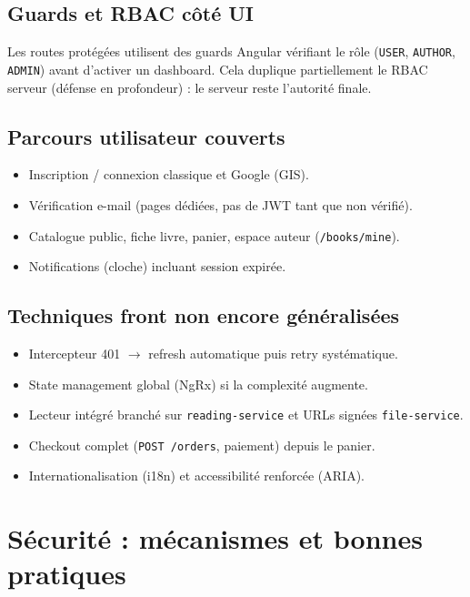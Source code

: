 \documentclass[12pt,a4paper]{report}
\begin{document}
\section{Guards et RBAC côté UI}
Les routes protégées utilisent des guards Angular vérifiant le rôle (\texttt{USER}, \texttt{AUTHOR}, \texttt{ADMIN}) avant d'activer un dashboard. Cela duplique partiellement le RBAC serveur (défense en profondeur) : le serveur reste l'autorité finale.\par

\section{Parcours utilisateur couverts}
\begin{itemize}
  \item Inscription / connexion classique et Google (GIS).
  \item Vérification e-mail (pages dédiées, pas de JWT tant que non vérifié).
  \item Catalogue public, fiche livre, panier, espace auteur (\texttt{/books/mine}).
  \item Notifications (cloche) incluant session expirée.
\end{itemize}

\section{Techniques front non encore généralisées}
\begin{itemize}
  \item Intercepteur 401 $\rightarrow$ refresh automatique puis retry systématique.
  \item State management global (NgRx) si la complexité augmente.
  \item Lecteur intégré branché sur \texttt{reading-service} et URLs signées \texttt{file-service}.
  \item Checkout complet (\texttt{POST /orders}, paiement) depuis le panier.
  \item Internationalisation (i18n) et accessibilité renforcée (ARIA).
\end{itemize}

\chapter{Sécurité : mécanismes et bonnes pratiques}
\end{document}
